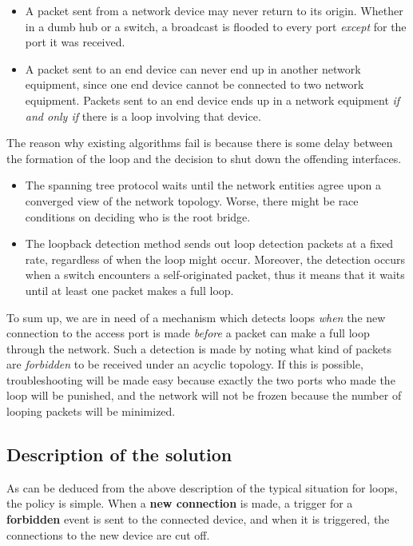 \documentclass{article}
\begin{document}
\begin{itemize}
    \item A packet sent from a network device may never return to its origin. Whether in a dumb hub or a switch, a broadcast is flooded to every port \textit{except} for the port it was received.
    \item A packet sent to an end device can never end up in another network equipment, since one end device cannot be connected to two network equipment. Packets sent to an end device ends up in a network equipment \textit{if and only if} there is a loop involving that device.
\end{itemize}

The reason why existing algorithms fail is because there is some delay between the formation of the loop and the decision to shut down the offending interfaces.
\begin{itemize}
    \item The spanning tree protocol waits until the network entities agree upon a converged view of the network topology. Worse, there might be race conditions on deciding who is the root bridge.
    \item The loopback detection method sends out loop detection packets at a fixed rate, regardless of when the loop might occur. Moreover, the detection occurs when a switch encounters a self-originated packet, thus it means that it waits until at least one packet makes a full loop.
\end{itemize}

To sum up, we are in need of a mechanism which detects loops \textit{when} the new connection to the access port is made \textit{before} a packet can make a full loop through the network. Such a detection is made by noting what kind of packets are \textit{forbidden} to be received under an acyclic topology. If this is possible, troubleshooting will be made easy because exactly the two ports who made the loop will be punished, and the network will not be frozen because the number of looping packets will be minimized.

\subsection{Description of the solution}

As can be deduced from the above description of the typical situation for loops, the policy is simple. When a \textbf{new connection} is made, a trigger for a \textbf{forbidden} event is sent to the connected device, and when it is triggered, the connections to the new device are cut off.
\end{document}
